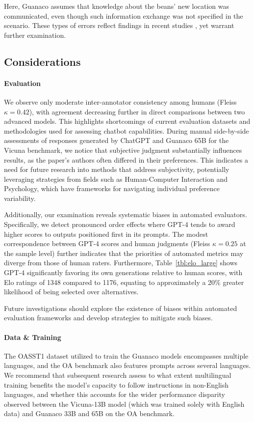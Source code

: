 Here, {Guanaco} assumes that knowledge about the beans' new location was communicated, even though such information exchange was not specified in the scenario. These types of errors reflect findings in recent studies \cite{sap2022neural}, yet warrant further examination.

\subsection{Considerations}
\label{ssec:considerations}

\paragraph{Evaluation}

We observe only moderate inter-annotator consistency among humans (Fleiss $\kappa=0.42$), with agreement decreasing further in direct comparisons between two advanced models. This highlights shortcomings of current evaluation datasets and methodologies used for assessing chatbot capabilities. During manual side-by-side assessments of responses generated by ChatGPT and {Guanaco} 65B for the Vicuna benchmark, we notice that subjective judgment substantially influences results, as the paper's authors often differed in their preferences. This indicates a need for future research into methods that address subjectivity, potentially leveraging strategies from fields such as Human-Computer Interaction and Psychology, which have frameworks for navigating individual preference variability.

Additionally, our examination reveals systematic biases in automated evaluators. Specifically, we detect pronounced order effects where GPT-4 tends to award higher scores to outputs positioned first in its prompts. The modest correspondence between GPT-4 scores and human judgments (Fleiss $\kappa=0.25$ at the sample level) further indicates that the priorities of automated metrics may diverge from those of human raters. Furthermore, Table~\ref{tbl:elo_large} shows GPT-4 significantly favoring its own generations relative to human scores, with Elo ratings of 1348 compared to 1176, equating to approximately a 20\% greater likelihood of being selected over alternatives.

Future investigations should explore the existence of biases within automated evaluation frameworks and develop strategies to mitigate such biases.

\paragraph{Data \& Training} The OASST1 dataset utilized to train the {Guanaco} models encompasses multiple languages, and the OA benchmark also features prompts across several languages. We recommend that subsequent research assess to what extent multilingual training benefits the model’s capacity to follow instructions in non-English languages, and whether this accounts for the wider performance disparity observed between the Vicuna-13B model (which was trained solely with English data) and {Guanaco} 33B and 65B on the OA benchmark.

